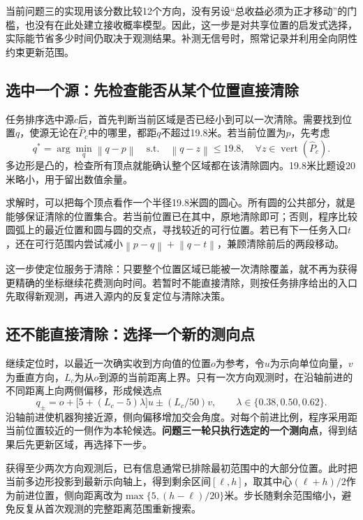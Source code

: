 \documentclass[UTF8,a4paper,12pt,fontset=fandol]{ctexart}
\newcommand{\norm}[1]{\left\lVert#1\right\rVert}
\begin{document}
当前问题三的实现用该分数比较12个方向，没有另设“总收益必须为正才移动”的门槛，也没有在此处建立接收概率模型。因此，这一步是对共享位置的启发式选择，实际能节省多少时间仍取决于观测结果。补测无信号时，照常记录并利用全向阴性约束更新范围。

\subsection{选中一个源：先检查能否从某个位置直接清除}
任务排序选中源$c$后，首先判断当前区域是否已经小到可以一次清除。需要找到位置$q$，使源无论在$\widehat P_c$中的哪里，都距$q$不超过19.8米。若当前位置为$p$，先考虑
\begin{equation}\label{eq:clearprojection}
q^*=\arg\min_q\norm{q-p}\quad\text{s.t.}\quad
\norm{q-z}\le19.8,\quad\forall z\in\operatorname{vert}(\widehat P_c).
\end{equation}
多边形是凸的，检查所有顶点就能确认整个区域都在该清除圆内。19.8米比题设20米略小，用于留出数值余量。

求解时，可以把每个顶点看作一个半径19.8米圆的圆心。所有圆的公共部分，就是能够保证清除的位置集合。若当前位置已在其中，原地清除即可；否则，程序比较圆弧上的最近位置和圆与圆的交点，寻找较近的可行位置。若已有下一任务入口$t$，还在可行范围内尝试减小$\norm{p-q}+\norm{q-t}$，兼顾清除前后的两段移动。

这一步使定位服务于清除：只要整个位置区域已能被一次清除覆盖，就不再为获得更精确的坐标继续花费测向时间。若暂时不能直接清除，则按任务排序给出的入口先取得新观测，再进入源内的反复定位与清除决策。

\subsection{还不能直接清除：选择一个新的测向点}
继续定位时，以最近一次确实收到方向值的位置$o$为参考，令$u$为示向单位向量，$v$为垂直方向，$L_c$为从$o$到源的当前距离上界。只有一次方向观测时，在沿轴前进的不同距离上向两侧偏移，形成候选点
\begin{equation}
q_\pm=o+\bigl[5+(L_c-5)\lambda\bigr]u\pm(L_c/50)v,
\qquad\lambda\in\{0.38,0.50,0.62\}.
\end{equation}
沿轴前进使机器狗接近源，侧向偏移增加交会角度。对每个前进比例，程序采用距当前位置较近的一侧作为本轮候选。\textbf{问题三一轮只执行选定的一个测向点}，得到结果后先更新区域，再选择下一步。

获得至少两次方向观测后，已有信息通常已排除最初范围中的大部分位置。此时把当前多边形投影到最新示向轴上，得到剩余区间$[\ell,h]$，取其中心$(\ell+h)/2$作为前进位置，侧向距离改为$\max\{5,(h-\ell)/20\}$米。步长随剩余范围缩小，避免反复从首次观测的完整距离范围重新搜索。
\end{document}
